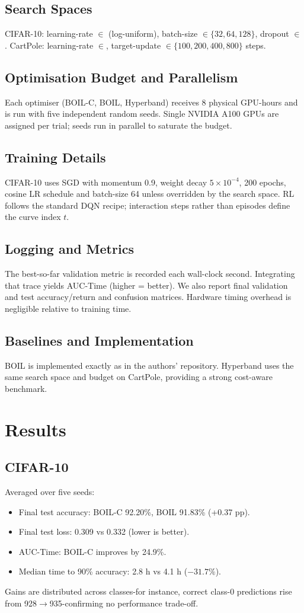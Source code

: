 \documentclass{article} %
\begin{document}
\subsection{Search Spaces}
CIFAR-10: learning-rate \(\in\) (log-uniform), batch-size \(\in\{32,64,128\}\), dropout \(\in\). CartPole: learning-rate \(\in\), target-update \(\in\{100,200,400,800\}\) steps.

\subsection{Optimisation Budget and Parallelism}
Each optimiser (BOIL-C, BOIL, Hyperband) receives 8 physical GPU-hours and is run with five independent random seeds. Single NVIDIA A100 GPUs are assigned per trial; seeds run in parallel to saturate the budget.

\subsection{Training Details}
CIFAR-10 uses SGD with momentum 0.9, weight decay \(5\times 10^{-4}\), 200 epochs, cosine LR schedule and batch-size 64 unless overridden by the search space. RL follows the standard DQN recipe; interaction steps rather than episodes define the curve index \(t\).

\subsection{Logging and Metrics}
The best-so-far validation metric is recorded each wall-clock second. Integrating that trace yields AUC-Time (higher = better). We also report final validation and test accuracy/return and confusion matrices. Hardware timing overhead is negligible relative to training time.

\subsection{Baselines and Implementation}
BOIL is implemented exactly as in the authors' repository. Hyperband uses the same search space and budget on CartPole, providing a strong cost-aware benchmark.

\section{Results}
\label{sec:results}
\subsection{CIFAR-10}
Averaged over five seeds:
\begin{itemize}
  \item Final test accuracy: BOIL-C 92.20\%, BOIL 91.83\% (+0.37 pp).
  \item Final test loss: 0.309 vs 0.332 (lower is better).
  \item AUC-Time: BOIL-C improves by 24.9\%.
  \item Median time to 90\% accuracy: 2.8 h vs 4.1 h (\(-31.7\%\)).
\end{itemize}
Gains are distributed across classes-for instance, correct class-0 predictions rise from 928\(\to\)935-confirming no performance trade-off.
\end{document}
